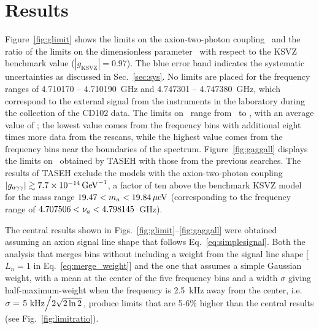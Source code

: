 \section{Results} \label{sec:results}

Figure~\ref{fig:glimit} shows the limits on the axion-two-photon coupling 
\gagg\ and the ratio of the limits on the dimensionless parameter \ggamma\ 
with respect to the KSVZ benchmark value ($\left|g_\text{KSVZ}\right|=0.97$).  
The blue error band indicates the systematic uncertainties as discussed in 
Sec.~\ref{sec:sys}. No limits are placed for the frequency ranges of 
4.710170 -- 4.710190~GHz and 4.747301 -- 4.747380~GHz, 
which correspond to the external signal from the instruments in the 
laboratory during the collection of the CD102 data. 
The limits on \gagg\ range from \lolimit\ to \hilimit, with an average 
value of \avelimit; the lowest value comes from the frequency bins with 
additional eight times more data from the rescans, while the highest value 
comes from the frequency bins near the boundaries of the spectrum. 
Figure~\ref{fig:gaggall} displays 
the limits on \gagg\ obtained by TASEH with those from the previous searches. 
The results of TASEH exclude the models with the axion-two-photon
coupling $\left|g_{a\gamma\gamma}\right|\gtrsim 7.7\times 10^{-14}\,\text{Ge\hspace{-.08em}V}^{-1}$, a factor of ten above the benchmark
KSVZ model for the mass range $19.47 < m_a < 19.84 \,\mu\text{e\hspace{-.08em}V}$ (corresponding to 
the frequency range of $4.707506 < \nu_a < 4.798145$~GHz). 


The central results shown in Figs.~\ref{fig:glimit}--\ref{fig:gaggall} were 
obtained assuming an axion signal line shape that follows 
Eq.~\eqref{eq:simplesignal}. Both the analysis that merges bins without 
including a weight from the signal line shape [$L_n=1$ in 
Eq.~\eqref{eq:merge_weight}] and the one 
that assumes a simple Gaussian weight, with a mean at the center of the five 
frequency bins and a width $\sigma$ 
giving half-maximum-weight when the frequency 
is 2.5~kHz away from the center, i.e. 
$\sigma=\left.5~\text{kHz}\middle/2\sqrt{2\ln2}\right.$, produce limits that 
are 5-6\% higher than the central results (see Fig.~\ref{fig:limitratio}). 


